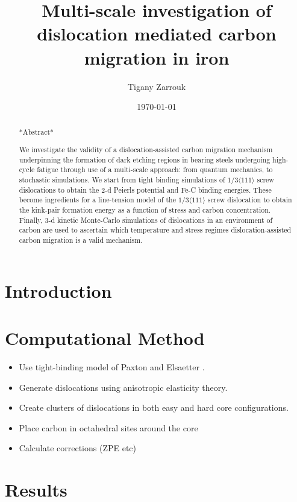 \documentclass[a4paper]{apa6}
\affiliation{King's College London}
\author{Tigany Zarrouk}
\date{\today}
\title{Multi-scale investigation of dislocation mediated carbon migration in iron}
\begin{document}
\maketitle
\tableofcontents

\begin{abstract}

*Abstract*

We investigate the validity of a dislocation-assisted carbon migration
mechanism underpinning the formation of dark etching regions in
bearing steels undergoing high-cycle fatigue through use of a
multi-scale approach: from quantum mechanics,
to stochastic simulations. We start from tight binding simulations of
$1/3\langle 111 \rangle$ screw dislocations to obtain the 2-d Peierls
potential and Fe-C binding energies. These become ingredients for a line-tension
model of the $1/3\langle 111 \rangle$ screw dislocation to obtain the kink-pair formation
energy as a function of stress and carbon concentration. Finally,
3-d kinetic Monte-Carlo simulations of dislocations in an environment
of carbon are used to ascertain which temperature and stress regimes
dislocation-assisted carbon migration is a valid mechanism. 

\end{abstract}


\section{Introduction}
\label{sec:org9bf46eb}

\section{Computational Method}
\label{sec:org4605623}

\begin{itemize}
\item Use tight-binding model of Paxton and Elsaetter \cite{Paxton2013}.
\item Generate dislocations using anisotropic elasticity theory.
\item Create clusters of dislocations in both easy and hard core
configurations.
\item Place carbon in octahedral sites around the core
\item Calculate corrections (ZPE etc)
\end{itemize}


\section{Results}
\label{sec:orgb186146}
\end{document}
